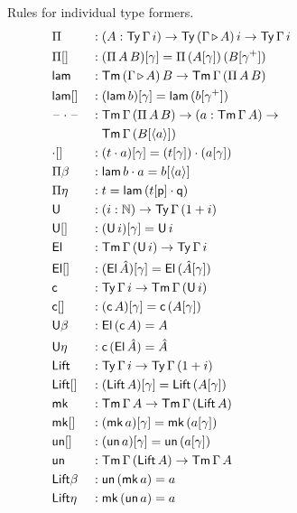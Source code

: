 \documentclass[submission,copyright,creativecommons]{eptcs}
\newcommand{\ra}{\rightarrow}
\newcommand{\Ty}{\mathsf{Ty}}
\newcommand{\Tm}{\mathsf{Tm}}
\newcommand{\p}{\mathsf{p}}
\newcommand{\q}{\mathsf{q}}
\newcommand{\ext}{\mathop{\triangleright}}
\newcommand{\N}{\mathbb{N}}
\newcommand{\lam}{\mathsf{lam}}
\newcommand{\U}{\mathsf{U}}
\newcommand{\El}{\mathsf{El}}
\newcommand{\cd}{\mathsf{c}}
\newcommand{\blank}{\mathord{\hspace{1pt}\text{--}\hspace{1pt}}} %
\newcommand{\Lift}{\mathsf{Lift}}
\newcommand{\mk}{\mathsf{mk}}
\newcommand{\un}{\mathsf{un}}
\begin{document}
\begin{multicols}{2}
\newcolumn
\noindent Rules for individual type formers.\vspace{-.5em}
\begin{alignat*}{10}
  & \Pi && : (A:\Ty\,\Gamma\,i)\ra\Ty\,(\Gamma\ext A)\,i\ra\Ty\,\Gamma\,i \hspace{10em} \\
  & \Pi[] && : (\Pi\,A\,B)[\gamma] = \Pi\,(A[\gamma])\,(B[\gamma^+]) \\
  & \lam && : \Tm\,(\Gamma\ext A)\,B\ra\Tm\,\Gamma\,(\Pi\,A\,B) \\
  & \lam[] && : (\lam\,b)[\gamma] = \lam\,(b[\gamma^+]) \\
  & \blank\cdot\blank && : \Tm\,\Gamma\,(\Pi\,A\,B)\ra(a:\Tm\,\Gamma\,A)\ra \\
  & && \hphantom{{}:{}} \Tm\,\Gamma\,(B[\langle a\rangle]) \\
  & {\cdot}[] && : (t\cdot a)[\gamma] = (t[\gamma])\cdot(a[\gamma]) \\
  & \Pi\beta && : \lam\,b\cdot a = b[\langle a\rangle] \\
  & \Pi\eta && : t = \lam\,(t[\p]\cdot\q) \\
  & \U && : (i:\N)\ra\Ty\,\Gamma\,(1+i) \\
  & \U[] && : (\U\,i)[\gamma] = \U\,i \\  
  & \El && : \Tm\,\Gamma\,(\U\,i) \ra \Ty\,\Gamma\,i \\
  & \El[] && : (\El\,\hat{A})[\gamma] = \El\,(\hat{A}[\gamma]) \\
  & \cd && : \Ty\,\Gamma\,i\ra\Tm\,\Gamma\,(\U\,i) \\
  & \cd[] && : (\cd\,A)[\gamma] = \cd\,(A[\gamma]) \\
  & \U\beta && : \El\,(\cd\,A) = A \\
  & \U\eta && : \cd\,(\El\,\hat{A}) = \hat{A} \\
  & \Lift && : \Ty\,\Gamma\,i\ra\Ty\,\Gamma\,(1+i) \\
  & \Lift[] && : (\Lift\,A)[\gamma] = \Lift\,(A[\gamma]) \\
  & \mk && : \Tm\,\Gamma\,A \ra \Tm\,\Gamma\,(\Lift\,A) \\
  & \mk[] && : (\mk\,a)[\gamma] = \mk\,(a[\gamma]) \\
  & \un[] && : (\un\,a)[\gamma] = \un\,(a[\gamma]) \\
  & \un && : \Tm\,\Gamma\,(\Lift\,A) \ra \Tm\,\Gamma\,A \\
  & \Lift\beta && : \un\,(\mk\,a) = a \\
  & \Lift\eta && : \mk\,(\un\,a) = a
\end{alignat*}
\end{multicols}
\end{document}
